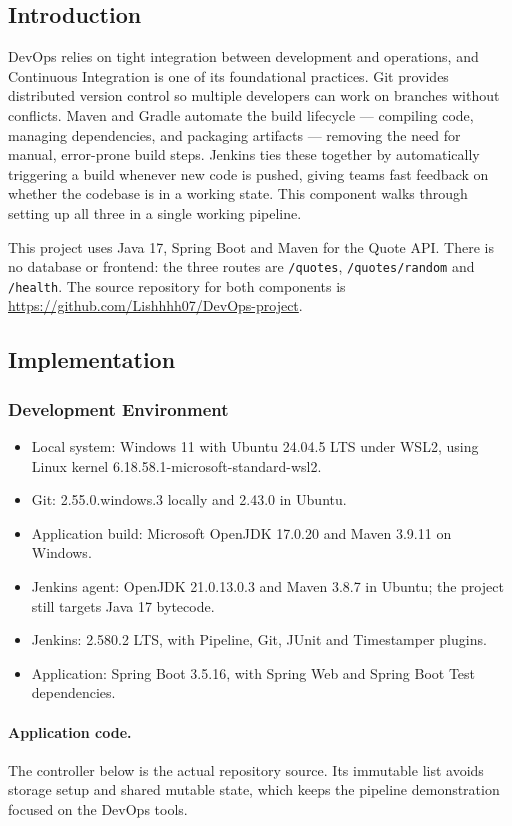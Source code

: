 \documentclass[12pt,a4paper]{article}
\begin{document}
\subsection*{Introduction}
DevOps relies on tight integration between development and operations, and Continuous Integration is one of its foundational practices. Git provides distributed version control so multiple developers can work on branches without conflicts. Maven and Gradle automate the build lifecycle --- compiling code, managing dependencies, and packaging artifacts --- removing the need for manual, error-prone build steps. Jenkins ties these together by automatically triggering a build whenever new code is pushed, giving teams fast feedback on whether the codebase is in a working state. This component walks through setting up all three in a single working pipeline.

This project uses Java 17, Spring Boot and Maven for the Quote API. There is no database or frontend: the three routes are \texttt{/quotes}, \texttt{/quotes/random} and \texttt{/health}. The source repository for both components is \url{https://github.com/Lishhhh07/DevOps-project}.

\subsection*{Implementation}
\subsubsection*{Development Environment}
\begin{itemize}[nosep]
\item Local system: Windows 11 with Ubuntu 24.04.5 LTS under WSL2, using Linux kernel 6.18.58.1-microsoft-standard-wsl2.
\item Git: 2.55.0.windows.3 locally and 2.43.0 in Ubuntu.
\item Application build: Microsoft OpenJDK 17.0.20 and Maven 3.9.11 on Windows.
\item Jenkins agent: OpenJDK 21.0.13.0.3 and Maven 3.8.7 in Ubuntu; the project still targets Java 17 bytecode.
\item Jenkins: 2.580.2 LTS, with Pipeline, Git, JUnit and Timestamper plugins.
\item Application: Spring Boot 3.5.16, with Spring Web and Spring Boot Test dependencies.
\end{itemize}

\paragraph{Application code.}
The controller below is the actual repository source. Its immutable list avoids storage setup and shared mutable state, which keeps the pipeline demonstration focused on the DevOps tools.
\end{document}
